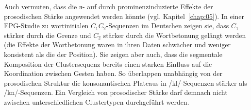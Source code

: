 Auch \citet{Bombien2010} vermuten, dass die π- auf durch prominenzinduzierte Effekte der prosodischen Stärke angewendet werden könnte (vgl. Kapitel~\ref{chap:05}). In einer EPG-Studie zu wortinitialen  ${C}_{1}{C}_{2}$-Sequenzen im Deutschen zeigen sie, dass ${C}_{1}$ stärker durch die Grenze und ${C}_{2}$ stärker durch die Wortbetonung gelängt werden (die Effekte der Wortbetonung waren in ihren Daten schwächer und weniger konsistent als die der Position). Sie zeigen aber auch, dass die segmentale Komposition der Clustersequenz bereits einen starken Einfluss auf die Koordination zwischen Gesten haben. So überlappen unabhängig von der prosodischen Struktur die konsonantischen Plateaus in /kl/-Sequenzen stärker als /kn/-Sequenzen. Ein Vergleich von prosodischer Stärke darf demnach nicht zwischen unterschiedlichen Clustertypen durchgeführt werden.